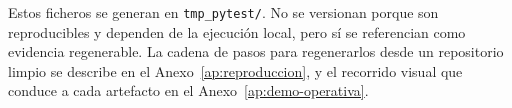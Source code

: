 Estos ficheros se generan en \texttt{tmp\_pytest/}. No se versionan porque son reproducibles y dependen de la ejecución local, pero sí se referencian como evidencia regenerable. La cadena de pasos para regenerarlos desde un repositorio limpio se describe en el Anexo~\ref{ap:reproduccion}, y el recorrido visual que conduce a cada artefacto en el Anexo~\ref{ap:demo-operativa}.
